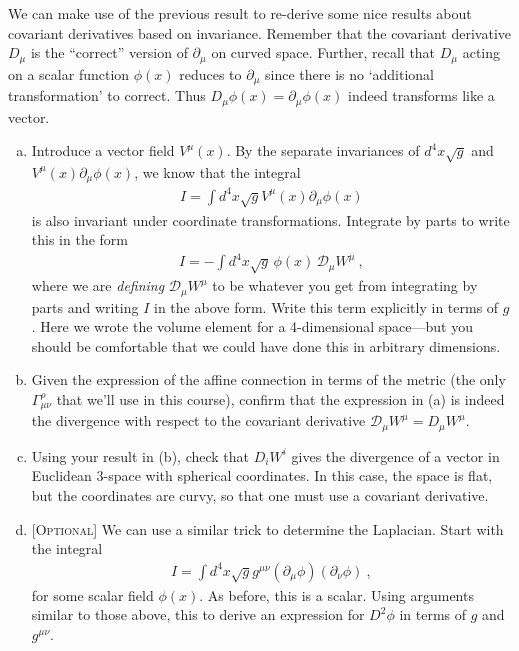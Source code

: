 \documentclass[12pt]{article}
\numberwithin{equation}{section}    %
\begin{document}
We can make use of the previous result to re-derive some nice results about covariant derivatives based on invariance. Remember that the covariant derivative $D_\mu$ is the ``correct'' version of $\partial_\mu$ on curved space. Further, recall that $D_\mu$ acting on a scalar function $\phi(x)$ reduces to $\partial_\mu$ since there is no `additional transformation' to correct. Thus $D_\mu\phi(x) = \partial_\mu\phi(x)$ indeed transforms like a vector.
\begin{enumerate}[(a)]
\item Introduce a vector field $V^\mu(x)$. By the separate invariances of $d^4x \sqrt{g}$ and $V^\mu(x) \partial_\mu \phi(x)$, we know that the integral
\begin{align}
	I = \int d^4x \sqrt{g} V^\mu(x) \partial_\mu \phi(x) 
\end{align}
is also invariant under coordinate transformations. Integrate by parts to write this in the form
\begin{align}
	I = - \int d^4x \sqrt{g} \, \phi(x) \, \mathcal D_\mu W^\mu \ ,
\end{align}
where we are \emph{defining} $\mathcal D_\mu W^\mu$ to be whatever you get from integrating by parts and writing $I$ in the above form. Write this term explicitly in terms of $g$. Here we wrote the volume element for a 4-dimensional space---but you should be comfortable that we could have done this in arbitrary dimensions.
\item Given the expression of the affine connection in terms of the metric (the only $\Gamma^\rho_{\mu\nu}$ that we'll use in this course), confirm that the expression in (a) is indeed the divergence with respect to the covariant derivative $\mathcal D_\mu W^\mu = D_\mu W^\mu$.
 \item Using your result in (b), check that $D_i W^i$ gives the divergence of a vector in Euclidean 3-space with spherical coordinates. In this case, the space is flat, but the coordinates are curvy, so that one must use a covariant derivative.
\item \textsc{[Optional]} We can use a similar trick to determine the Laplacian. Start with the integral
	\begin{align}
		I = \int d^4x \sqrt{g} g^{\mu\nu} (\partial_\mu \phi)(\partial_\nu \phi) \ ,
	\end{align}
	for some scalar field $\phi(x)$. As before, this is a scalar. Using arguments similar to those above, this to derive an expression for $D^2\phi$ in terms of $g$  and $g^{\mu\nu}$. 
	

\end{enumerate}
\end{document}
